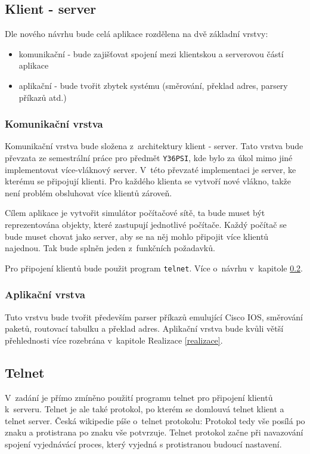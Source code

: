 
\subsection{Klient - server}\label{klient_server}
Dle nového návrhu bude celá aplikace rozdělena na dvě základní vrstvy:
\begin{itemize}
 \item komunikační - bude zajišťovat spojení mezi klientskou a serverovou částí aplikace
 \item aplikační - bude tvořit zbytek systému (směrování, překlad adres, parsery příkazů atd.)
\end{itemize}

\subsubsection{Komunikační vrstva}
Komunikační vrstva bude složena z~architektury klient - server. Tato vrstva bude převzata ze semestrální práce pro předmět \verb|Y36PSI|, kde bylo za úkol mimo jiné implementovat více-vláknový server. V~této převzaté implementaci je server, ke kterému se připojují klienti. Pro každého klienta se vytvoří nové vlákno, takže není problém obsluhovat více klientů zároveň. 

Cílem aplikace je vytvořit simulátor počítačové sítě, ta bude muset být reprezentována objekty, které zastupují jednotlivé počítače. Každý počítač se bude muset chovat jako server, aby se na něj mohlo připojit více klientů najednou. Tak bude splněn jeden z~funkčních požadavků.

Pro připojení klientů bude použit program \verb|telnet|. Více o~návrhu v~kapitole \ref{telnet}. 


\subsubsection{Aplikační vrstva}
Tuto vrstvu bude tvořit především parser příkazů emulující Cisco IOS, směrování paketů, routovací tabulku a překlad adres. Aplikační vrstva bude kvůli větší přehlednosti více rozebrána v~kapitole Realizace \ref{realizace}.


\subsection{Telnet} \label{telnet}
V~zadání je přímo zmíněno použití programu telnet pro připojení klientů k~serveru. Telnet je ale také protokol, po kterém se domlouvá telnet klient a telnet server. Česká wikipedie píše o~telnet protokolu: \cite{wiki:telnet} Protokol tedy vše posílá po znaku a protistrana po znaku vše potvrzuje. Telnet protokol začne při navazování spojení vyjednávácí proces, který vyjedná s protistranou budoucí nastavení.

